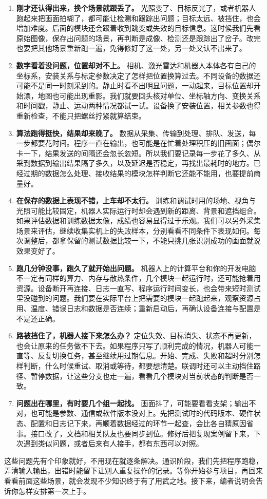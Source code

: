 \begin{enumerate}
    \item \textbf{刚才还认得出来，换个场景就跟丢了。}
    光照变了、目标反光了，或者机器人跑起来把画面拍糊了，都可能让检测和跟踪出问题；目标太远、被挡住，也会增加难度。后面的模块还会跟着收到跳变或失效的目标信息。这时候我们先看原始图像，保存出问题的场景，再判断是成像、检测还是跟踪出了岔子。改完也要把其他场景重新跑一遍，免得修好了这一处，另一处又认不出来了。

    \item \textbf{数字看着没问题，位置却对不上。}
    相机、激光雷达和机器人本体各有自己的坐标系，安装关系与标定参数决定了怎样把位置换算过去。不同设备的数据还可能不是同一时刻采到的。静止时看不出明显问题，一动起来，目标位置却开始漂，地图也可能出现重影。我们就要回头核对单位、坐标轴方向、变换关系和时间戳，静止、运动两种情况都试一试。设备换了安装位置，相关参数也得重新检查，不能只把螺丝拧紧就算结束。

    \item \textbf{算法跑得挺快，结果却来晚了。}
    数据从采集、传输到处理、排队、发送，每一步都要花时间。程序一直在输出，也可能是在忙着处理积压的旧画面；偶尔卡一下，结果发送的间隔还会忽长忽短。所以我们要记录每一步花了多久、从采到数据到输出结果隔了多久，以及延迟是否稳定，再找出最耗时的地方。已经过期的数据怎么处理、接收结果的模块怎样判断它还能不能用，也要提前商量好。

    \item \textbf{在保存的数据上表现不错，上车却不太行。}
    训练和调试时用的场地、视角与光照可能比较固定，机器人实际运行时却会遇到新的距离、背景和遮挡组合。如果评估数据和训练数据太像，成绩也容易显得过于乐观。我们可以另外采集场景来评估，继续收集实机上的失败样本，分别看看不同条件下表现如何。每次调整后，都拿保留的测试数据比较一下，不能只挑几张识别成功的画面就说效果变好了。

    \item \textbf{跑几分钟没事，跑久了就开始出问题。}
    机器人上的计算平台和你的开发电脑不一定有同样的算力、内存与散热条件，几个模块一起运行时，还可能抢着用资源。设备断开再连接、日志一直写、程序运行时间变长，也会带来短时测试里没碰到的问题。我们要在实际平台上把需要的模块一起跑起来，观察资源占用、温度、错误日志和数据是否连续；重新启动后，再确认设备连接与配置是不是还正确。

    \item \textbf{路被挡住了，机器人接下来怎么办？}
    定位失效、目标消失、状态不再更新，也会让原来的任务做不下去。如果程序只写了顺利完成的情况，机器人可能一直等、反复切换任务，甚至继续用过期信息。开始、完成、失败和超时分别怎样判断，什么时候重试、取消或等待，都要想清楚。联调时还可以主动挡住路径、暂停数据，让这些分支也走一遍，看看几个模块对当前状态的判断是否一致。

    \item \textbf{问题出在哪里，有时要几个组一起找。}
    画面抖了，可能要看看支架；输出不对，也可能是参数、通信或软件版本没对上。先把测试时的代码版本、硬件状态、配置和日志记下来，再顺着数据经过的环节一起查，会比各自猜原因省事。接口改了，文档和相关队友也要同步到位。修好后把复现案例留下来，下次遇到类似问题，或者后来有人接手，都有东西可以对照。
\end{enumerate}

这些问题先有个印象就好，不用现在就逐条解决。通识阶段，我们先把程序跑稳，弄清输入输出，出错时能留下让别人重复操作的记录。等你开始参与项目，再回来看看前面这些场景，就会发现不少知识终于有了用武之地。接下来，编者说明会告诉你怎样安排第一次上手。
\par
\endgroup
